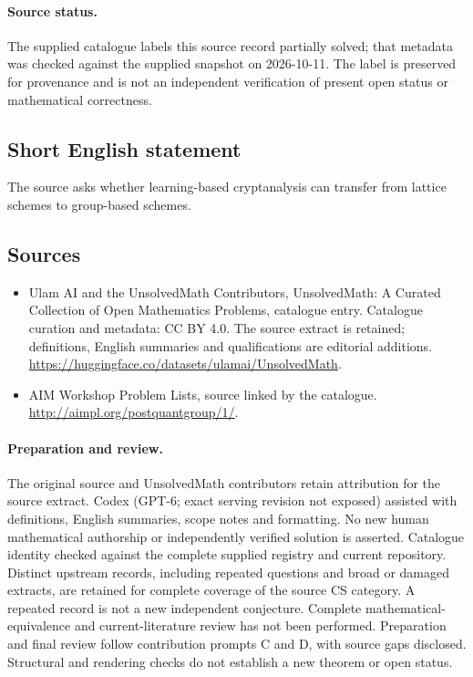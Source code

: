 \documentclass[11pt]{article}
\begin{document}
\paragraph{Source status.}
The supplied catalogue labels this source record partially solved; that metadata was checked against the supplied snapshot on 2026-10-11. The label is preserved for provenance and is not an independent verification of present open status or mathematical correctness.
\subsection{Short English statement}
The source asks whether learning-based cryptanalysis can transfer from lattice schemes to group-based schemes.
\subsection{Sources}
\begin{itemize}
\item[\hypertarget{source:statement:1}{S1}] Ulam AI and the UnsolvedMath Contributors, UnsolvedMath: A Curated Collection of Open Mathematics Problems, catalogue entry. Catalogue curation and metadata: CC BY 4.0. The source extract is retained; definitions, English summaries and qualifications are editorial additions.
\url{https://huggingface.co/datasets/ulamai/UnsolvedMath}.
\item[\hypertarget{source:statement:2}{S2}] AIM Workshop Problem Lists, source linked by the catalogue.
\url{http://aimpl.org/postquantgroup/1/}.
\end{itemize}
\paragraph{Preparation and review.}
The original source and UnsolvedMath contributors retain attribution for the source extract. Codex (GPT-6; exact serving revision not exposed) assisted with definitions, English summaries, scope notes and formatting. No new human mathematical authorship or independently verified solution is asserted. Catalogue identity checked against the complete supplied registry and current repository. Distinct upstream records, including repeated questions and broad or damaged extracts, are retained for complete coverage of the source CS category. A repeated record is not a new independent conjecture. Complete mathematical-equivalence and current-literature review has not been performed. Preparation and final review follow contribution prompts C and D, with source gaps disclosed. Structural and rendering checks do not establish a new theorem or open status.
\label{end:statement}
\end{document}
